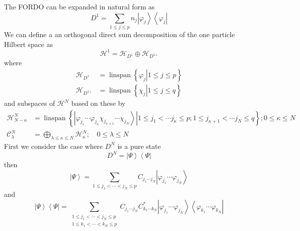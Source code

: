 \documentclass[aps,preprint]{revtex4}%
\begin{document}
The FORDO can be expanded in natural form as%
\begin{equation}
D^{1}=\sum_{1\leq j\leq p}n_{j}\left\vert \varphi_{j}\right\rangle
\left\langle \varphi_{j}\right\vert \label{nat}%
\end{equation}
We can define a an orthogonal direct sum decomposition of the one particle
Hilbert space as
\begin{equation}
\mathcal{H}^{1}=\mathcal{H}_{D^{1}}\oplus\mathcal{H}_{D^{1\bot}}%
\end{equation}
where
\begin{align}
\mathcal{H}_{D^{1}}  &  =\operatorname{linspan}\left\{  \left.  \varphi
_{j}\right\vert 1\leq j\leq p\right\} \nonumber\\
\mathcal{H}_{D^{1\bot}}  &  =\operatorname{linspan}\left\{  \left.  \chi
_{j}\right\vert 1\leq j\leq q\right\}
\end{align}
and subspaces of $\mathcal{H}^{N}$ based on these by%
\begin{align}
\mathcal{H}_{N-\kappa}^{N}  &  =\operatorname{linspan}\left\{  \left.
\left\vert \varphi_{j_{1}}\cdots\varphi_{j_{\kappa}}\chi_{j_{\kappa+1}}%
\cdots\chi_{j_{N}}\right\rangle \right\vert 1\leq j_{1}<\cdots j_{\kappa}\leq
p;1\leq j_{\kappa+1}<\cdots j_{N}\leq q\right\}  ;0\leq\kappa\leq N\nonumber\\
\mathcal{C}_{\lambda}^{N}  &  =%
{\displaystyle\bigoplus\limits_{\lambda\leq\kappa\leq N}}
\mathcal{H}_{\kappa}^{N};\quad0\leq\lambda\leq N
\end{align}
First we consider the case where $D^{N}$ is a pure state
\begin{equation}
D^{N}=\left\vert \Psi\right\rangle \left\langle \Psi\right\vert
\end{equation}
then
\begin{equation}
\left\vert \Psi\right\rangle =\sum_{1\leq j_{1}<\cdots<j_{N}\leq p}%
C_{j_{1}\cdots j_{N}}\left\vert \varphi_{j_{1}}\cdots\varphi_{j_{N}%
}\right\rangle
\end{equation}
and
\begin{equation}
\left\vert \Psi\right\rangle \left\langle \Psi\right\vert =\sum
_{\substack{1\leq j_{1}<\cdots<j_{N}\leq p\\1\leq k_{1}<\cdots<k_{N}\leq
p}}C_{j_{1}\cdots j_{N}}C_{k_{1}\cdots k_{N}}^{\ast}\left\vert \varphi_{j_{1}%
}\cdots\varphi_{j_{N}}\right\rangle \left\langle \varphi_{k_{1}}\cdots
\varphi_{k_{N}}\right\vert
\end{equation}
\end{document}
